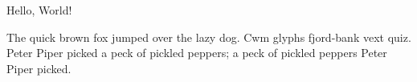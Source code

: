 \documentclass{gsmemo}
\begin{document}
\subject{MPhil to PhD transfer}

\maketitle

Hello, World!

The quick brown fox jumped over the lazy dog.  Cwm glyphs fjord-bank
vext quiz.  Peter Piper picked a peck of pickled peppers; a peck of
pickled peppers Peter Piper picked.
\end{document}
